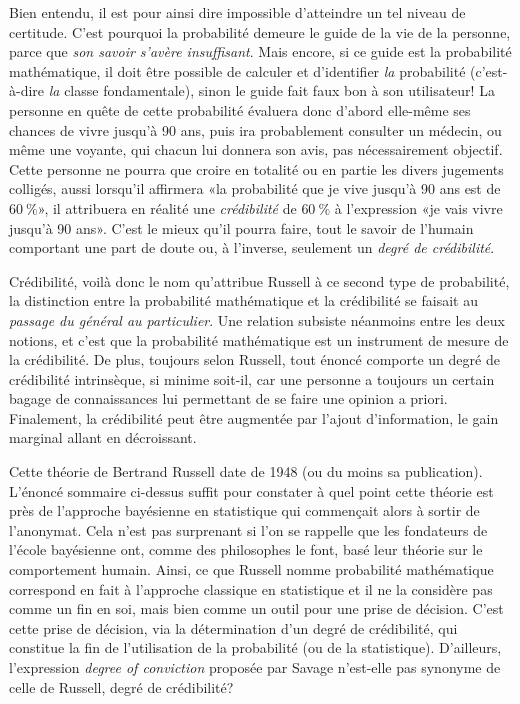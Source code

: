 Bien entendu, il est pour ainsi dire impossible d'atteindre un tel
niveau de certitude. C'est pourquoi la probabilité demeure le guide de
la vie de la personne, parce que \emph{son savoir s'avère
  insuffisant}. Mais encore, si ce guide est la probabilité
mathématique, il doit être possible de calculer et d'identifier
\emph{la} probabilité (c'est-à-dire \emph{la} classe fondamentale),
sinon le guide fait faux bon à son utilisateur! La personne en quête
de cette probabilité évaluera donc d'abord elle-même ses chances de
vivre jusqu'à 90 ans, puis ira probablement consulter un médecin, ou
même une voyante, qui chacun lui donnera son avis, pas nécessairement
objectif. Cette personne ne pourra que croire en totalité ou en partie
les divers jugements colligés, aussi lorsqu'il affirmera «la
probabilité que je vive jusqu'à 90 ans est de $60~\%$», il attribuera
en réalité une \emph{crédibilité} de $60~\%$ à l'expression «je vais
vivre jusqu'à 90 ans». C'est le mieux qu'il pourra faire, tout le
savoir de l'humain comportant une part de doute ou, à
l'inverse, seulement un \emph{degré de crédibilité}.

Crédibilité, voilà donc le nom qu'attribue Russell à ce second type de
probabilité, la distinction entre la probabilité mathématique et la
crédibilité se faisait au \emph{passage du général au particulier}.
Une relation subsiste néanmoins entre les deux notions, et c'est que
la probabilité mathématique est un instrument de mesure de la
crédibilité. De plus, toujours selon Russell, tout énoncé comporte un
degré de crédibilité intrinsèque, si minime soit-il, car une personne
a toujours un certain bagage de connaissances lui permettant de se
faire une opinion a priori. Finalement, la crédibilité peut être
augmentée par l'ajout d'information, le gain marginal allant en
décroissant.

Cette théorie de Bertrand Russell date de 1948 (ou du moins sa
publication). L'énoncé sommaire ci-dessus suffit pour constater à quel
point cette théorie est près de l'approche bayésienne en statistique
qui commençait alors à sortir de l'anonymat. Cela n'est pas surprenant
si l'on se rappelle que les fondateurs de l'école bayésienne ont,
comme des philosophes le font, basé leur théorie sur le comportement
humain. Ainsi, ce que Russell nomme probabilité mathématique correspond
en fait à l'approche classique en statistique et il ne la considère
pas comme un fin en soi, mais bien comme un outil pour une prise de
décision. C'est cette prise de décision, via la détermination d'un
degré de crédibilité, qui constitue la fin de l'utilisation de la
probabilité (ou de la statistique). D'ailleurs, l'expression
\emph{degree of conviction} proposée par Savage n'est-elle pas
synonyme de celle de Russell, degré de crédibilité?

